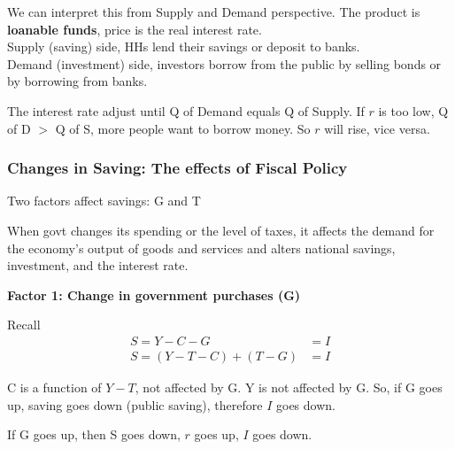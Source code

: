 \documentclass[12pt]{article}
\begin{document}
We can interpret this from Supply and Demand perspective. The product is {\textbf {
loanable funds}}, price is the real interest rate.\\
Supply (saving) side, HHs lend their savings or deposit to banks. \\
Demand (investment) side, investors borrow from the public by selling bonds or 
by borrowing from banks.

The interest rate adjust until Q of Demand equals Q of Supply. If $ r $ is too low,
Q of D $ > $ Q of S, more people want to borrow money. So $ r $ will rise, vice versa.



\subsubsection{Changes in Saving: The effects of Fiscal Policy}

Two factors affect savings: G and T


When govt changes its spending or the level of taxes, it affects the demand for the
economy's output of goods and services and alters national savings, investment, and
the interest rate.

{\textbf {Factor 1: Change in government purchases (G)}}

Recall
\begin{align*}
S = Y - C - G &= I\\
S = (Y - T - C) + (T - G) &= I
\end{align*}

C is a function of $ Y - T $, not affected by G. Y is not affected by G. So, if G 
goes up, saving goes down (public saving), therefore $ I $ goes down.

If G goes up, then S goes down, $ r $ goes up, $ I $ goes down.
\begin{figure}[H]
\end{figure}
\end{document}
